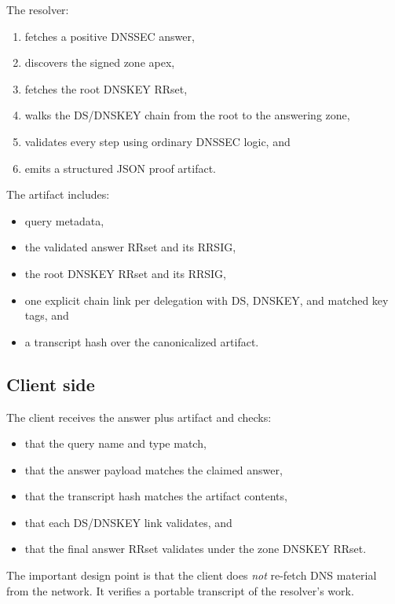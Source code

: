 \documentclass[11pt]{article}
\begin{document}
The resolver:

\begin{enumerate}[nosep]
    \item fetches a positive DNSSEC answer,
    \item discovers the signed zone apex,
    \item fetches the root DNSKEY RRset,
    \item walks the DS/DNSKEY chain from the root to the answering zone,
    \item validates every step using ordinary DNSSEC logic, and
    \item emits a structured JSON proof artifact.
\end{enumerate}

The artifact includes:

\begin{itemize}[nosep]
    \item query metadata,
    \item the validated answer RRset and its RRSIG,
    \item the root DNSKEY RRset and its RRSIG,
    \item one explicit chain link per delegation with DS, DNSKEY, and matched key tags, and
    \item a transcript hash over the canonicalized artifact.
\end{itemize}

\subsection*{Client side}

The client receives the answer plus artifact and checks:

\begin{itemize}[nosep]
    \item that the query name and type match,
    \item that the answer payload matches the claimed answer,
    \item that the transcript hash matches the artifact contents,
    \item that each DS/DNSKEY link validates, and
    \item that the final answer RRset validates under the zone DNSKEY RRset.
\end{itemize}

The important design point is that the client does \emph{not} re-fetch DNS material from the network. It verifies a portable transcript of the resolver's work.
\end{document}
